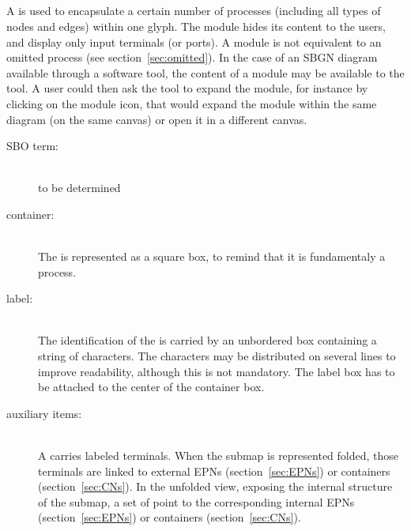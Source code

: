 \color{green}
\subsection{}\label{sec:submap}

A  is used to encapsulate a certain number of processes (including all types of nodes and edges) within one glyph. The module hides its content to the users, and display only input terminals (or ports). A module is not equivalent to an omitted process (see section~\ref{sec:omitted}). In the case of an SBGN diagram available through a software tool, the content of a module may be available to the tool. A user could then ask the tool to expand the module, for instance by clicking on the module icon, that would expand the module within the same diagram (on the same canvas) or open it in a different canvas.

\begin{description}
\item[SBO term:]\mbox{}\\ to be determined
\item[container:]\mbox{}\\ The  is represented as a square box, to remind that it is fundamentaly a process.
\item[label:] \mbox{}\\ The identification of the  is carried by an unbordered box containing a string of
  characters. The characters may be distributed on several lines to improve readability, although this is not mandatory.  The label box has to be attached to the center of the container box.
\item[auxiliary items:]\mbox{}\\ A  carries labeled terminals. When the submap is represented folded, those terminals are linked to external EPNs (section~\ref{sec:EPNs}) or containers (section~\ref{sec:CNs}). In the unfolded view, exposing the internal structure of the submap, a set of  point to the corresponding internal EPNs (section~\ref{sec:EPNs}) or containers (section~\ref{sec:CNs}).
\end{description}

